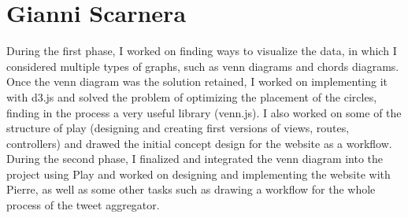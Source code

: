 \section{Gianni Scarnera}

During the first phase, I worked on finding ways to visualize the data, in which I considered multiple types of graphs, such as venn diagrams and chords diagrams. Once the venn diagram was the solution retained, I worked on implementing it with d3.js and solved the problem of optimizing the placement of the circles, finding in the process a very useful library (venn.js). I also worked on some of the structure of play (designing and creating first versions of views, routes, controllers) and drawed the initial concept design for the website as a workflow.\\
During the second phase, I finalized and integrated the venn diagram into the project using Play and worked on designing and implementing the website with Pierre, as well as some other tasks such as drawing a workflow for the whole process of the tweet aggregator.





